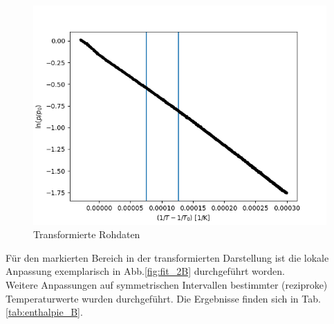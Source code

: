 \documentclass[12pt,a4paper]{article}
\begin{document}
\begin{figure}
\begin{center}
\includegraphics[width=\linewidth]{Bilder/log_RohdatenB}
\caption[Rohdaten logarith. B]{Transformierte Rohdaten}
\label{fig:logB}
\end{center}
\end{figure}

Für den markierten Bereich in der transformierten Darstellung ist die lokale Anpassung exemplarisch in Abb.\ref{fig:fit_2B} durchgeführt worden.\\
Weitere Anpassungen auf symmetrischen Intervallen bestimmter (reziproke) Temperaturwerte wurden durchgeführt. Die Ergebnisse finden sich in Tab. \ref{tab:enthalpie_B}.
\end{document}
